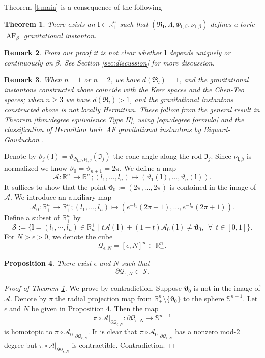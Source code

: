\documentclass[a4paper,11pt]{amsart}
\newtheorem{theorem}{Theorem}[section]
\newtheorem{proposition}[theorem]{Proposition}
\newtheorem{remark}[theorem]{Remark}
\theoremstyle{definition}
\numberwithin{equation}{section}
\newcommand{\p}{\partial}
\newcommand{\bl}{\bm{l}}
\newcommand{\btheta}{\bm{\vartheta}}
\newcommand{\R}{\mathbb{R}}
\newcommand{\mI} {\mathfrak I}
\newcommand{\mR} {\mathfrak R}
\DeclareMathOperator{\AF}{AF}
\begin{document}
Theorem \ref{t:main} is a consequence of the following 
\begin{theorem}\label{t:adjusting angle}
There exists an $\bl\in \R^n_+$ such that $(\mR_{\bl}, \Lambda, \Phi_{\bl, \beta},\nu_{\bl, \beta})$ defines a toric $\AF_\beta$ gravitational instanton.
\end{theorem}
\begin{remark}
    From our proof it is not clear whether $\bl$ depends uniquely or continuously on $\beta$. See Section \ref{sec:discussion} for more discussion.
\end{remark}
\begin{remark}
When $n=1$ or $n=2$, we have $d(\mR_l)=1$, and the gravitational instantons constructed above coincide with the Kerr spaces and the Chen-Teo spaces; when $n\geq 3$ we have $d(\mR_l)>1$, and the gravitational instantons constructed above  is not locally Hermitian. These follow from the general result in Theorem \ref{thm:degree equivalence Type II}, using \eqref{eqn:degree formula} and the classification of Hermitian toric AF gravitational instantons by Biquard-Gauduchon \cite{BG}. 
\end{remark}
Denote by $\vartheta_j(\bl)=\vartheta_{\Phi_{\bl, \beta}, \nu_{\bl, \beta}}(\mI_j)$ the cone angle along the rod $\mI_j$. Since $\nu_{\bl, \beta}$ is normalized we know $\vartheta_0=\vartheta_{n+1}=2\pi$.  We define a map 
\begin{equation}
    \mathcal{A}:\mathbb{R}^n_+\to\mathbb{R}^n_+;(l_1,\ldots,l_n)\mapsto (\vartheta_1(\bl),\ldots,\vartheta_n(\bl)).
    \end{equation}
It suffices to show that the point ${\btheta}_0:=(2\pi,\ldots,2\pi)$ is contained in the image of $\mathcal{A}$. We introduce an auxiliary map 
    $$\mathcal{A}_{0}:\mathbb{R}^n_+\to\mathbb{R}^n_+; (l_1,\ldots,l_n)\mapsto(e^{-l_1}(2\pi+1),\ldots,e^{-l_n}(2\pi+1)).$$
    Define a subset of $\R^n_+$ by
    $$\mathcal S:=\{\bl=(l_1, \cdots, l_n)\in \R_n^+\mid t\mathcal{A}(\bl)+(1-t)\mathcal{A}_0(\bl)\neq \btheta_0, \ \ \forall \ \  t\in [0, 1]\}.$$
For $N>\epsilon>0$, we denote the cube $$\mathcal{Q}_{\epsilon,N} =[\epsilon,N]^n\subset \R_+^n.$$

\begin{proposition} \label{p:boundary avoid}There exist $\epsilon$ and $N$ such that  $$\p\mathcal Q_{\epsilon, N}\subset \mathcal S.$$
\end{proposition}

\begin{proof}[Proof of Theorem \ref{t:adjusting angle}]
   We prove by contradiction. Suppose $\btheta_0$ is not in the image of $\mathcal A$. Denote by $\pi$ the radial projection map from $\R^n_+\setminus \{\btheta_0\}$ to the sphere $\mathbb S^{n-1}$.  Let $\epsilon$ and $N$ be given in Proposition \ref{p:boundary avoid}. Then the map $$\pi\circ \mathcal A|_{\p \mathcal Q_{\epsilon, N}}: {\p \mathcal Q_{\epsilon, N}}\rightarrow \mathbb S^{n-1}$$ is homotopic to $\pi\circ \mathcal A_0|_{\p\mathcal Q_{\epsilon, N}}$. It is clear that $\pi\circ \mathcal A_0|_{\p\mathcal Q_{\epsilon, N}}$ has a nonzero mod-2 degree but $\pi\circ \mathcal A|_{\p\mathcal Q_{\epsilon, N}}$ is contractible. Contradiction. 
\end{proof}   
\end{document}
